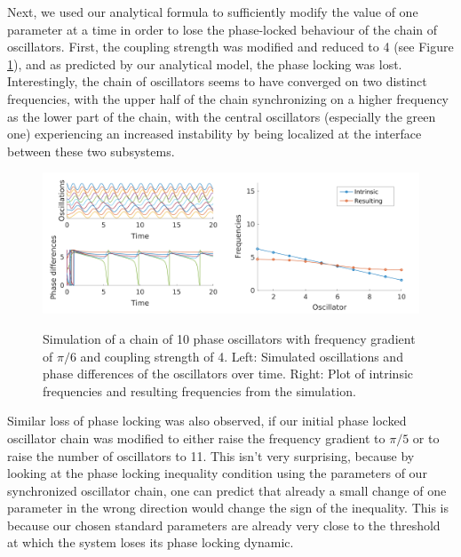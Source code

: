 \documentclass[a4paper]{scrartcl}
\begin{document}
Next, we used our analytical formula to sufficiently modify the value of one parameter at a time in order to lose the phase-locked behaviour of the chain of oscillators. First, the coupling strength was modified and reduced to 4 (see Figure \ref{fig:f6a-unstablecoupling}), and as predicted by our analytical model, the phase locking was lost. Interestingly, the chain of oscillators seems to have converged on two distinct frequencies, with the upper half of the chain synchronizing on a higher frequency as the lower part of the chain, with the central oscillators (especially the green one) experiencing an increased instability by being localized at the interface between these two subsystems.

\begin{figure}[!t]
	\centering
	\includegraphics[width=0.5\textwidth]{fig/chain_phase_oscil-6a_unstable.png}\includegraphics[width=0.5\textwidth]{fig/chain_phase_oscil_freq-6a_unstable.png}
	\caption{Simulation of a chain of 10 phase oscillators with frequency gradient of $\pi /6$ and coupling strength of 4. Left: Simulated oscillations and phase differences of the oscillators over time. Right: Plot of intrinsic frequencies and resulting frequencies from the simulation.}
	\label{fig:f6a-unstablecoupling}
\end{figure}

Similar loss of phase locking was also observed, if our initial phase locked oscillator chain was modified to either raise the frequency gradient to $\pi /5$ or to raise the number of oscillators to 11. This isn't very surprising, because by looking at the phase locking inequality condition using the parameters of our synchronized oscillator chain, one can predict that already a small change of one parameter in the wrong direction would change the sign of the inequality. This is because our chosen standard parameters are already very close to the threshold at which the system loses its phase locking dynamic.
\end{document}
